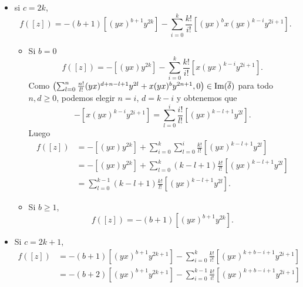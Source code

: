 \documentclass[fleqn,../tesis.tex]{subfiles}
\begin{document}
\begin{itemize}
	\item si $c = 2k$,
	\[
		f([z]) = -(b + 1)\left[(yx)^{b + 1}y^{2k}\right] - \sum_{i  = 0}^k\frac{k!}{i!}\left[(yx)^bx(yx)^{k - i}y^{2i + 1}\right].
	\]	
	
	\begin{itemize}
		\item Si $b = 0$
		\[
			f([z]) = -\left[(yx)y^{2k}\right] - \sum_{i  = 0}^k\frac{k!}{i!}\left[x(yx)^{k - i}y^{2i + 1}\right].
		\]
		Como $\left(\sum_{l = 0}^n\frac{n!}{l!}(yx)^{d + n - l + 1}y^{2l} + x(yx)^by^{2n + 1}, 0\right) \in \operatorname{Im}(\overline{\delta})$
		para todo $n,d \geq 0$, podemos elegir $n = i$, $d = k - i$ y obtenemos que 
		\[
			-\left[x(yx)^{k - i}y^{2i + 1}\right] = \sum_{l = 0}^i\frac{i!}{l!}\left[(yx)^{k - l + 1}y^{2l}\right].
		\]
		Luego
		\begin{align*}
			f([z]) &= -\left[(yx)y^{2k}\right] + \sum_{i  = 0}^k\sum_{l = 0}^i\frac{k!}{l!}\left[(yx)^{k - l + 1}y^{2l}\right]\\
			&= -\left[(yx)y^{2k}\right] + \sum_{l = 0}^{k}(k - l + 1)\frac{k!}{l!}\left[(yx)^{k - l + 1}y^{2l}\right]\\
			&= \sum_{l = 0}^{k - 1}(k - l + 1)\frac{k!}{l!}\left[(yx)^{k - l + 1}y^{2l}\right].
		\end{align*}
		\item Si $b \geq 1$,
		\[		
		f([z]) = -(b + 1)\left[(yx)^{b + 1}y^{2k}\right].
		\]	
	\end{itemize}
	\item Si $c = 2k + 1$,
	\begin{align*}
	    f([z]) &= -(b + 1)\left[(yx)^{b + 1}y^{2k + 1}\right] - \sum_{i  = 0}^k\frac{k!}{i!}\left[(yx)^{k + b - i + 1}y^{2i + 1}\right]\\
	    &= -(b + 2)\left[(yx)^{b + 1}y^{2k + 1}\right] - \sum_{i  = 0}^{k - 1}\frac{k!}{i!}\left[(yx)^{k + b - i + 1}y^{2i + 1}\right]
	\end{align*}
\end{itemize}
\end{document}

